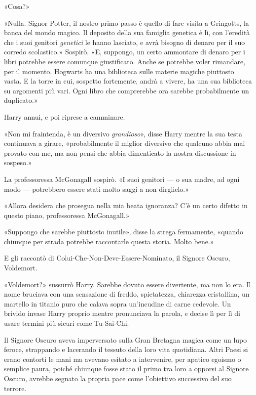 «Cosa?»

«Nulla. Signor Potter, il nostro primo passo è quello di fare visita a Gringotts, la banca del mondo magico. Il deposito della sua famiglia genetica è lì, con l’eredità che i suoi genitori \textit{genetici} le hanno lasciato, e avrà bisogno di denaro per il suo corredo scolastico.» Sospirò. «E, suppongo, un certo ammontare di denaro per i libri potrebbe essere comunque giustificato. Anche se potrebbe voler rimandare, per il momento. Hogwarts ha una biblioteca sulle materie magiche piuttosto vasta. E la torre in cui, sospetto fortemente, andrà a vivere, ha una sua biblioteca su argomenti più vari. Ogni libro che comprerebbe ora sarebbe probabilmente un duplicato.»

Harry annuì, e poi riprese a camminare.

«Non mi fraintenda, è un diversivo \textit{grandioso}», disse Harry mentre la sua testa continuava a girare, «probabilmente il miglior diversivo che qualcuno abbia mai provato con me, ma non pensi che abbia dimenticato la nostra discussione in sospeso.»

La professoressa McGonagall sospirò. «I suoi genitori — o sua madre, ad ogni modo — potrebbero essere stati molto saggi a non dirglielo.»

«Allora desidera che prosegua nella mia beata ignoranza? C’è un certo difetto in questo piano, professoressa McGonagall.»

«Suppongo che sarebbe piuttosto inutile», disse la strega fermamente, «quando chiunque per strada potrebbe raccontarle questa storia. Molto bene.»

E gli raccontò di Colui-Che-Non-Deve-Essere-Nominato, il Signore Oscuro, Voldemort.

«Voldemort?» sussurrò Harry. Sarebbe dovuto essere divertente, ma non lo era. Il nome bruciava con una sensazione di freddo, spietatezza, chiarezza cristallina, un martello in titanio puro che calava sopra un’incudine di carne cedevole. Un brivido invase Harry proprio mentre pronunciava la parola, e decise lì per lì di usare termini più sicuri come Tu-Sai-Chi.

Il Signore Oscuro aveva imperversato sulla Gran Bretagna magica come un lupo feroce, strappando e lacerando il tessuto della loro vita quotidiana. Altri Paesi si erano contorti le mani ma avevano esitato a intervenire, per apatico egoismo o semplice paura, poiché chiunque fosse stato il primo tra loro a opporsi al Signore Oscuro, avrebbe segnato la propria pace come l’obiettivo successivo del suo terrore.

